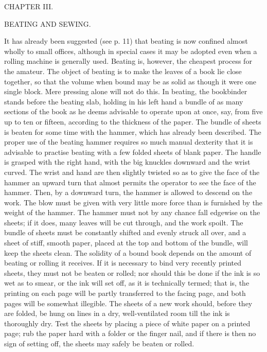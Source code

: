 \documentclass[twoside]{book}
\begin{document}
\pagebreak


\thispagestyle{empty}

\vspace*{\fill}

\begin{center}

\begin{large}CHAPTER III.\end{large}

\begin{small}BEATING AND SEWING.\end{small}

\end{center}

\noindent
It has already been suggested (see p. 11) that
beating is now confined almost wholly to small offices,
although in special cases it may be adopted even
when a rolling machine is generally used. Beating
is, however, the cheapest process for the amateur.
The object of beating is to make the leaves of a
book lie close together, so that the volume when
bound may be as solid as though it were one single
block. Mere pressing alone will not do this. In
beating, the bookbinder stands before the beating
slab, holding in his left hand a bundle of as many
sections of the book as he deems advisable to
operate upon at once, say, from five up to ten or
fifteen, according to the thickness of the paper.
The bundle of sheets is beaten for some time with
the hammer, which has already been described. The
proper use of the beating hammer requires so
much manual dexterity that it is advisable to
practise beating with a few folded sheets of blank
paper. The handle is grasped with the right hand,
with the big knuckles downward and the wrist
curved. The wrist and hand are then slightly
twisted so as to give the face of the hammer an
upward turn that almost permits the operator to
see the face of the hammer. Then, by a downward
turn, the hammer is allowed to descend on the work.
The blow must be given with very little more force
than is furnished by the weight of the hammer.
The hammer must not by any chance fall edgewise
on the sheets; if it does, many leaves will be cut
through, and the work spoilt. The bundle of sheets
\pagebreak
must be constantly shifted and evenly struck all
over, and a sheet of stiff, smooth paper, placed at
the top and bottom of the bundle, will keep the
sheets clean. The solidity of a bound book depends
on the amount of beating or rolling it receives.
If it is necessary to bind very recently printed
sheets, they must not be beaten or rolled; nor
should this be done if the ink is so wet as to smear,
or the ink will set off, as it is technically termed;
that is, the printing on each page will be partly
transferred to the facing page, and both pages will
be somewhat illegible. The sheets of a new work
should, before they are folded, be hung on lines in
a dry, well-ventilated room till the ink is thoroughly
dry. Test the sheets by placing a piece of white
paper on a printed page; rub the paper hard with
a folder or the finger nail, and if there is then no
sign of setting off, the sheets may safely be beaten
or rolled.
\end{document}

